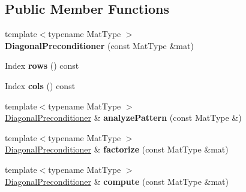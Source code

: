 \subsection*{Public Member Functions}
\begin{DoxyCompactItemize}
\item 
\mbox{\label{class_eigen_1_1_diagonal_preconditioner_ad7d67c2d25072f73543031e4853d443b}} 
{\footnotesize template$<$typename Mat\+Type $>$ }\\{\bfseries Diagonal\+Preconditioner} (const Mat\+Type \&mat)
\item 
\mbox{\label{class_eigen_1_1_diagonal_preconditioner_abfa8fc0d88fd77c131cf0bf8a88d8c4d}} 
Index {\bfseries rows} () const
\item 
\mbox{\label{class_eigen_1_1_diagonal_preconditioner_ab6e72d6ba6e848c2669e7453ccbf1e2b}} 
Index {\bfseries cols} () const
\item 
\mbox{\label{class_eigen_1_1_diagonal_preconditioner_af9a7205f04b0ef833b3fae8b2c3f6cc9}} 
{\footnotesize template$<$typename Mat\+Type $>$ }\\\mbox{\hyperlink{class_eigen_1_1_diagonal_preconditioner}{Diagonal\+Preconditioner}} \& {\bfseries analyze\+Pattern} (const Mat\+Type \&)
\item 
\mbox{\label{class_eigen_1_1_diagonal_preconditioner_a3bb1bae9f49ff115fb21f951101fb88a}} 
{\footnotesize template$<$typename Mat\+Type $>$ }\\\mbox{\hyperlink{class_eigen_1_1_diagonal_preconditioner}{Diagonal\+Preconditioner}} \& {\bfseries factorize} (const Mat\+Type \&mat)
\item 
\mbox{\label{class_eigen_1_1_diagonal_preconditioner_a4b938c483a6d17bfc079f2fde8671a08}} 
{\footnotesize template$<$typename Mat\+Type $>$ }\\\mbox{\hyperlink{class_eigen_1_1_diagonal_preconditioner}{Diagonal\+Preconditioner}} \& {\bfseries compute} (const Mat\+Type \&mat)
\item 
\mbox{\label{class_eigen_1_1_diagonal_preconditioner_a3bbc5d91d64e3968c3b0b629e15e9fb7}} 

\end{DoxyCompactItemize}

